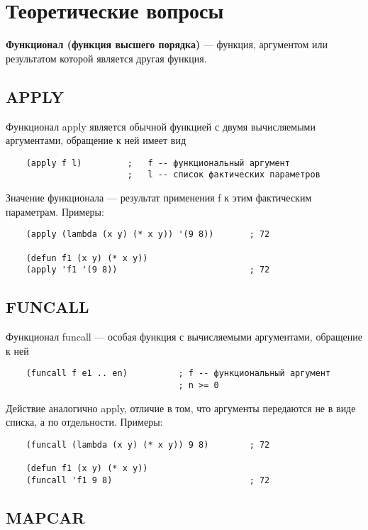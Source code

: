 \chapter{Теоретические вопросы}

\textbf{Функционал (функция высшего порядка)} --- функция, аргументом или результатом которой является другая функция.

\section{APPLY}

Функционал apply является обычной функцией с двумя вычисляемыми аргументами, обращение к ней имеет вид 
\begin{lstlisting}
    (apply f l)         ;   f -- функциональный аргумент 
                        ;   l -- список фактических параметров
\end{lstlisting}

Значение функционала --- результат применения f к этим фактическим параметрам. Примеры:

\begin{lstlisting}
    (apply (lambda (x y) (* x y)) '(9 8))       ; 72

    (defun f1 (x y) (* x y))
    (apply 'f1 '(9 8))                          ; 72
\end{lstlisting}

\section{FUNCALL}

Функционал funcall --- особая функция с вычисляемыми аргументами, обращение к ней
\begin{lstlisting}
    (funcall f e1 .. en)          ; f -- функциональный аргумент 
                                  ; n >= 0
\end{lstlisting}

Действие аналогично apply, отличие в том, что аргументы передаются не в виде списка, а по отдельности. Примеры:

\begin{lstlisting}
    (funcall (lambda (x y) (* x y)) 9 8)        ; 72

    (defun f1 (x y) (* x y))
    (funcall 'f1 9 8)                           ; 72
\end{lstlisting}

\section{MAPCAR}

